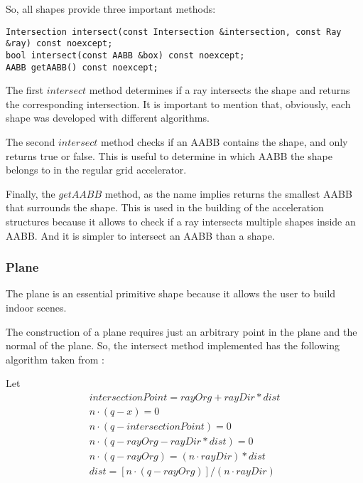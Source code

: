 So, all shapes provide three important methods:

\begin{lstlisting}[caption={Main methods in Shape}, captionpos=b, label=Shape]
Intersection intersect(const Intersection &intersection, const Ray &ray) const noexcept;
bool intersect(const AABB &box) const noexcept;
AABB getAABB() const noexcept;
\end{lstlisting}

The first
$intersect$
method determines if a ray intersects the shape and returns the corresponding intersection.
It is important to mention that, obviously, each shape was developed with different algorithms.

The second
$intersect$
method checks if an AABB contains the shape, and only returns true or false.
This is useful to determine in which AABB the shape belongs to in the regular grid accelerator.

Finally, the
$getAABB$
method, as the name implies returns the smallest AABB that surrounds the shape.
This is used in the building of the acceleration structures because it allows to check if a ray intersects multiple shapes inside an AABB.
And it is simpler to intersect an AABB than a shape.

\subsubsection{Plane}

\par
The plane is an essential primitive shape because it allows the user to build indoor scenes.

\par
The construction of a plane requires just an arbitrary point in the plane and the normal of the plane.
So, the intersect method implemented has the following algorithm taken from \cite{RayPlane}:

Let
\begin{equation}
\label{intersectionPlane}
\begin{aligned}
intersectionPoint = rayOrg + rayDir * dist \\
n \cdot (q - x) = 0 \\
n \cdot (q - intersectionPoint) = 0 \\
n \cdot (q - rayOrg - rayDir * dist) = 0 \\
n \cdot (q - rayOrg) = (n \cdot rayDir) * dist \\
dist = [ n \cdot (q - rayOrg) ] / (n \cdot rayDir) \\
\end{aligned}
\end{equation}

